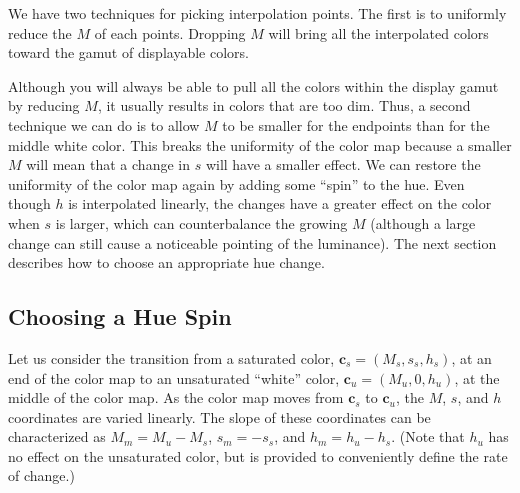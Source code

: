 \documentclass{llncs}
\newcommand*{\cvec}[1]{\mathbf{#1}}
\begin{document}
We have two techniques for picking interpolation points.  The first is to
uniformly reduce the $M$ of each points.  Dropping $M$ will bring all the
interpolated colors toward the gamut of displayable colors.

Although you will always be able to pull all the colors within the display
gamut by reducing $M$, it usually results in colors that are too dim.
Thus, a second technique we can do is to allow $M$ to be smaller for the
endpoints than for the middle white color.  This breaks the uniformity of
the color map because a smaller $M$ will mean that a change in $s$ will
have a smaller effect.  We can restore the uniformity of the color map
again by adding some ``spin'' to the hue.  Even though $h$ is interpolated
linearly, the changes have a greater effect on the color when $s$ is
larger, which can counterbalance the growing $M$ (although a large change
can still cause a noticeable pointing of the luminance).  The next section
describes how to choose an appropriate hue change.

\subsection{Choosing a Hue Spin}
\label{sec:ChoosingAHueSpin}

Let us consider the transition from a saturated color, $\cvec{c}_s=(M_s,
s_s, h_s)$, at an end of the color map to an unsaturated ``white'' color,
$\cvec{c}_u=(M_u, 0, h_u)$, at the middle of the color map.  As the
color map moves from $\cvec{c}_s$ to $\cvec{c}_u$, the $M$, $s$, and $h$
coordinates are varied linearly.  The slope of these coordinates can be
characterized as $M_m = M_u - M_s$, $s_m = -s_s$, and $h_m = h_u - h_s$.
(Note that $h_u$ has no effect on the unsaturated color, but is provided to
conveniently define the rate of change.)
\end{document}
